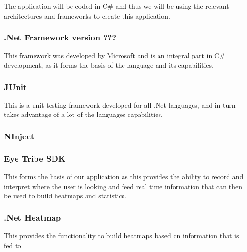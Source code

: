 The application will be coded in C# and thus we will be using the relevant architectures and frameworks to create this application.

\subsubsection{.Net Framework version ???}
\begin{flushleft}
	This framework was developed by Microsoft and is an integral part in C# development, as it forms the basis of the language and its capabilities.
\end{flushleft}

\subsubsection{JUnit}
\begin{flushleft}
This is a unit testing framework developed for all .Net languages, and in turn takes advantage of a lot of the languages capabilities.
\end{flushleft}

\subsubsection{NInject}
\begin{flushleft}
\end{flushleft}

\subsubsection{Eye Tribe SDK}
\begin{flushleft}
This forms the basis of our application as this provides the ability to record and interpret where the user is looking and feed real time information that can then be used to build heatmaps and statistics.
\end{flushleft}

\subsubsection{.Net Heatmap}
\begin{flushleft}
This provides the functionality to build heatmaps based on information that is fed to 
\end{flushleft}